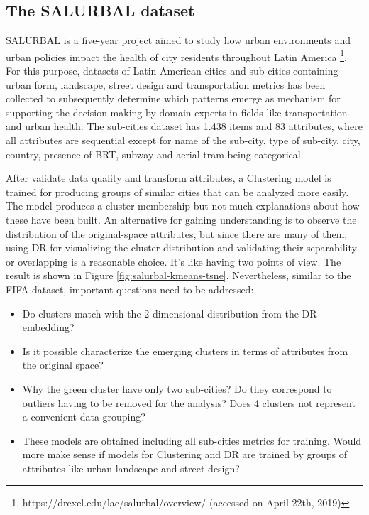 \subsection{The SALURBAL dataset} %
\label{subsection1.1.2}

SALURBAL is a five-year project aimed to study how urban environments and urban policies impact the health of city residents throughout Latin America \footnote{https://drexel.edu/lac/salurbal/overview/ (accessed on April 22th, 2019)}. For this purpose, datasets of Latin American cities and sub-cities containing urban form, landscape, street design and transportation metrics has been collected to subsequently determine which patterns emerge as mechanism for supporting the decision-making by domain-experts in fields like transportation and urban health. The sub-cities dataset has 1.438 items and 83 attributes, where all attributes are sequential except for name of the sub-city, type of sub-city, city, country, presence of BRT, subway and aerial tram being categorical.

After validate data quality and transform attributes, a Clustering model is trained for producing groups of similar cities that can be analyzed more easily. The model produces a cluster membership but not much explanations about how these have been built. An alternative for gaining understanding is to observe the distribution of the original-space attributes, but since there are many of them, using DR for visualizing the cluster distribution and validating their separability or overlapping is a reasonable choice. It's like having two points of view. The result is shown in Figure \ref{fig:salurbal-kmeans-tsne}. Nevertheless, similar to the FIFA dataset, important questions need to be addressed: 

\begin{itemize}
\item Do clusters match with the 2-dimensional distribution from the DR embedding?
\item Is it possible characterize the emerging clusters in terms of attributes from the original space?
\item Why the green cluster have only two sub-cities? Do they correspond to outliers having to be removed for the analysis? Does 4 clusters not represent a convenient data grouping?
\item These models are obtained including all sub-cities metrics for training. Would more make sense if models for Clustering and DR are trained by groups of attributes like urban landscape and street design?
\end{itemize}

